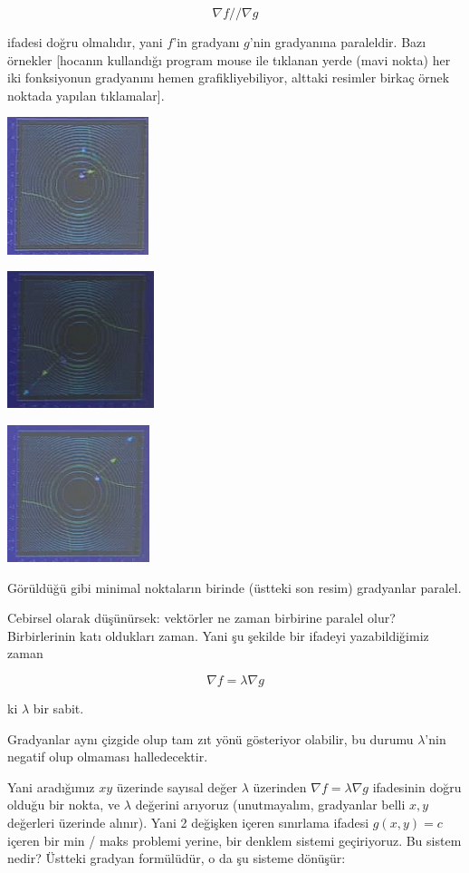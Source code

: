 \documentclass[12pt,fleqn]{article}\usepackage{../../common}
\begin{document}
$$ \nabla f // \nabla g $$

ifadesi doğru olmalıdır, yani $f$'in gradyanı $g$'nin gradyanına
paraleldir. Bazı örnekler [hocanın kullandığı program mouse ile tıklanan
yerde (mavi nokta) her iki fonksiyonun gradyanını hemen grafikliyebiliyor,
alttaki resimler birkaç örnek noktada yapılan tıklamalar]. 

\includegraphics[height=4cm]{13_4.png}

\includegraphics[height=4cm]{13_6.png}

\includegraphics[height=4cm]{13_5.png}

Görüldüğü gibi minimal noktaların birinde (üstteki son resim) gradyanlar
paralel. 

Cebirsel olarak düşünürsek: vektörler ne zaman birbirine paralel olur?
Birbirlerinin katı oldukları zaman. Yani şu şekilde bir ifadeyi
yazabildiğimiz zaman

$$ \nabla f = \lambda \nabla g $$

ki $\lambda$ bir sabit. 

Gradyanlar aynı çizgide olup tam zıt yönü gösteriyor olabilir, bu durumu
$\lambda$'nin negatif olup olmaması halledecektir.

Yani aradığımız $xy$ üzerinde sayısal değer $\lambda$ üzerinden $\nabla f =
\lambda \nabla g $ ifadesinin doğru olduğu bir nokta, ve $\lambda$ değerini
arıyoruz (unutmayalım, gradyanlar belli $x,y$ değerleri üzerinde alınır). Yani 2
değişken içeren sınırlama ifadesi $g(x,y)=c$ içeren bir min / maks problemi
yerine, bir denklem sistemi geçiriyoruz. Bu sistem nedir?  Üstteki gradyan
formülüdür, o da şu sisteme dönüşür:
\end{document}
